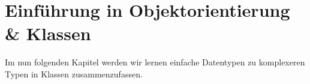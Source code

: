 \chapter[Objektorientierung]{Einführung in Objektorientierung \& Klassen}
\pagestyle{empty}

Im nun folgenden Kapitel werden wir lernen einfache Datentypen zu komplexeren Typen in Klassen zusammenzufassen.

\pagestyle{fancy}





\pagestyle{empty}
